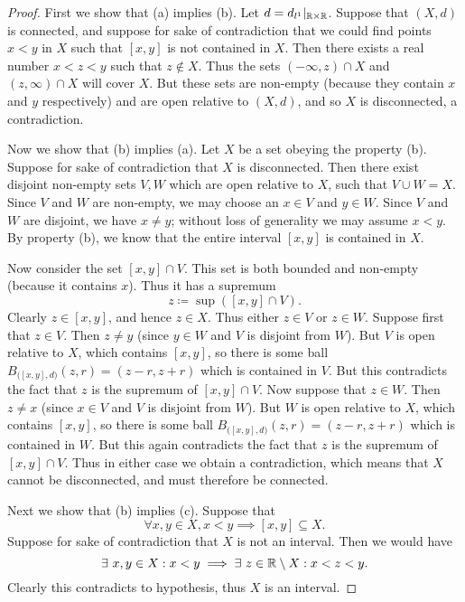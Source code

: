 \begin{proof}
  First we show that (a) implies (b).
  Let \(d = d_{l^1}|_{\mathbb{R} \times \mathbb{R}}\).
  Suppose that \((X, d)\) is connected, and suppose for sake of contradiction that we could find points \(x < y\) in \(X\) such that \([x, y]\) is not contained in \(X\).
  Then there exists a real number \(x < z < y\) such that \(z \notin X\).
  Thus the sets \((-\infty, z) \cap X\) and \((z, \infty) \cap X\) will cover \(X\).
  But these sets are non-empty (because they contain \(x\) and \(y\) respectively) and are open relative to \((X, d)\), and so \(X\) is disconnected, a contradiction.

  Now we show that (b) implies (a).
  Let \(X\) be a set obeying the property (b).
  Suppose for sake of contradiction that \(X\) is disconnected.
  Then there exist disjoint non-empty sets \(V , W\) which are open relative to \(X\), such that \(V \cup W = X\).
  Since \(V\) and \(W\) are non-empty, we may choose an \(x \in V\) and \(y \in W\).
  Since \(V\) and \(W\) are disjoint, we have \(x \neq y\);
  without loss of generality we may assume \(x < y\).
  By property (b), we know that the entire interval \([x, y]\) is contained in \(X\).

  Now consider the set \([x, y] \cap V\).
  This set is both bounded and non-empty (because it contains \(x\)).
  Thus it has a supremum
  \[
    z \coloneqq \sup([x, y] \cap V).
  \]
  Clearly \(z \in [x, y]\), and hence \(z \in X\).
  Thus either \(z \in V\) or \(z \in W\).
  Suppose first that \(z \in V\).
  Then \(z \neq y\) (since \(y \in W\) and \(V\) is disjoint from \(W\)).
  But \(V\) is open relative to \(X\), which contains \([x, y]\), so there is some ball \(B_{\big([x,y], d\big)}(z, r) = (z - r, z + r)\) which is contained in \(V\).
  But this contradicts the fact that \(z\) is the supremum of \([x, y] \cap V\).
  Now suppose that \(z \in W\).
  Then \(z \neq x\) (since \(x \in V\) and \(V\) is disjoint from \(W\)).
  But \(W\) is open relative to \(X\), which contains \([x, y]\), so there is some ball \(B_{\big([x,y], d\big)}(z, r) = (z - r, z + r)\) which is contained in \(W\).
  But this again contradicts the fact that \(z\) is the supremum of \([x, y] \cap V\).
  Thus in either case we obtain a contradiction, which means that \(X\) cannot be disconnected, and must therefore be connected.

  Next we show that (b) implies (c).
  Suppose that
  \[
    \forall x, y \in X, x < y \implies [x, y] \subseteq X.
  \]
  Suppose for sake of contradiction that \(X\) is not an interval.
  Then we would have
  \[
    \exists\ x, y \in X : x < y \implies \exists\ z \in \R \setminus X : x < z < y.
  \]
  Clearly this contradicts to hypothesis, thus \(X\) is an interval.


\end{proof}
